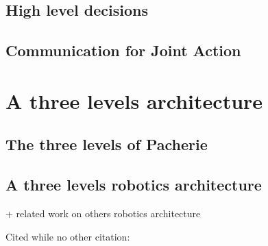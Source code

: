 \documentclass[english,a4paper,11pt,twoside]{StyleThese}
\begin{document}
\subsection{High level decisions}

\subsection{Communication for Joint Action}



\section{A three levels architecture}

\subsection{The three levels of Pacherie}

\subsection{A three levels robotics architecture}

+ related work on others robotics architecture


Cited while no other citation: \cite{goossens93}

\ifdefined{}
\else


\end{document}
